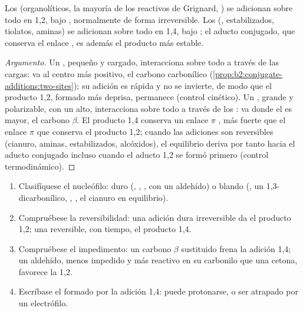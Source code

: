 \begin{proposition}\label{prop:b2:conjugate-additions:regio}
Los  (organolíticos, la mayoría de los reactivos de Grignard, ) se adicionan sobre todo en 1,2, bajo , normalmente de forma irreversible. Los  (,  estabilizados, tiolatos,
aminas) se adicionan sobre todo en 1,4, bajo ; el aducto conjugado, que conserva el enlace , es
además el producto más estable.
\end{proposition}

\begin{proof}[Argumento]
Un , pequeño y cargado, interacciona sobre todo a través de las cargas: va al centro más positivo,
el carbono carbonílico (\cref{prop:b2:conjugate-additions:two-sites}); su adición es rápida y
no se invierte, de modo que el producto 1,2, formado más deprisa, permanece (control cinético). Un ,
grande y polarizable, con un  alto, interacciona sobre todo a través de los : va donde
el  es mayor, el carbono $\beta$. El producto 1,4 conserva un enlace $\pi$ , más fuerte que el
enlace $\pi$  que conserva el producto 1,2; cuando las adiciones son reversibles (cianuro, aminas,
 estabilizados, alcóxidos), el equilibrio deriva por tanto hacia el aducto conjugado incluso cuando el
aducto 1,2 se formó primero (control termodinámico).
\end{proof}

\begin{method}\label{met:b2:conjugate-additions:predict-mode}
\begin{enumerate}
  \item Clasifíquese el nucleófilo: duro (, , ,  con un aldehído)
        o blando (, un  1,3-dicarbonílico, , , el cianuro en equilibrio).
  \item Compruébese la reversibilidad: una adición dura irreversible da el producto 1,2; una reversible,
        con tiempo, el producto 1,4.
  \item Compruébese el impedimento: un carbono $\beta$ sustituido frena la adición 1,4; un aldehído, menos impedido
        y más reactivo en su carbonilo que una cetona, favorece la 1,2.
  \item Escríbase el  formado por la adición 1,4: puede protonarse, o ser atrapado por un
        electrófilo.
\end{enumerate}
\end{method}

